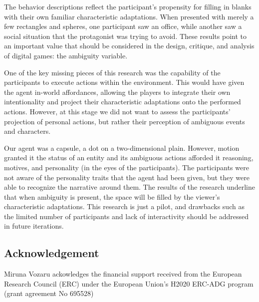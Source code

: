 The behavior descriptions reflect the participant’s propensity for filling in blanks with their own familiar characteristic adaptations. When presented with merely a few rectangles and spheres, one participant saw an office, while another saw a social situation that the protagonist was trying to avoid. These results point to an important value that should be considered in the design, critique, and analysis of digital games: the ambiguity variable.

One of the key missing pieces of this research was the capability of the participants to execute actions within the environment. This would have given the agent in-world affordances, allowing the players to integrate their own intentionality and project their characteristic adaptations onto the performed actions. However, at this stage we did not want to assess the participants’ projection of personal actions, but rather their perception of ambiguous events and characters.

Our agent was a capsule, a dot on a two-dimensional plain. However, motion granted it the status of an entity and its ambiguous actions afforded it reasoning, motives, and personality (in the eyes of the participants). The participants were not aware of the personality traits that the agent had been given, but they were able to recognize the narrative around them. The results of the research underline that when ambiguity is present, the space will be filled by the viewer’s characteristic adaptations. This research is just a pilot, and drawbacks such as the limited number of participants and lack of interactivity should be addressed in future iterations.

\subsection{Acknowledgement}

Miruna Vozaru ackowledges the financial support received from the European Research Council (ERC) under the European Union’s H2020 ERC-ADG program (grant agreement No 695528)

